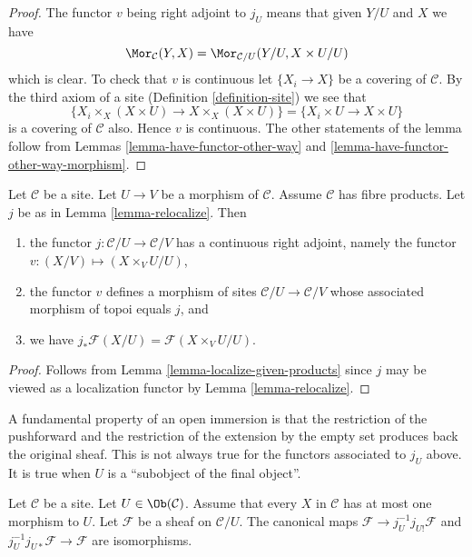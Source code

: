 \begin{proof}
The functor $v$ being right adjoint to $j_U$ means that given $Y/U$ and $X$
we have
$$
\Mor_\mathcal{C}(Y, X)
=
\Mor_{\mathcal{C}/U}(Y/U, X \times U/U)
$$
which is clear. To check that $v$ is continuous let $\{X_i \to X\}$ be
a covering of $\mathcal{C}$. By the third axiom of a site
(Definition \ref{definition-site})
we see that
$$
\{X_i \times_X (X \times U) \to X \times_X (X \times U)\}
=
\{X_i \times U \to X \times U\}
$$
is a covering of $\mathcal{C}$ also. Hence $v$ is continuous. The other
statements of the lemma follow from Lemmas \ref{lemma-have-functor-other-way}
and \ref{lemma-have-functor-other-way-morphism}.
\end{proof}

\begin{lemma}
\label{lemma-relocalize-given-fibre-products}
Let $\mathcal{C}$ be a site. Let $U \to V$ be a morphism of $\mathcal{C}$.
Assume $\mathcal{C}$ has fibre products. Let $j$ be as in
Lemma \ref{lemma-relocalize}. Then
\begin{enumerate}
\item the functor $j : \mathcal{C}/U \to \mathcal{C}/V$
has a continuous right adjoint, namely the functor
$v : (X/V) \mapsto (X \times_V U/U)$,
\item the functor $v$ defines a morphism of sites
$\mathcal{C}/U \to \mathcal{C}/V$ whose associated morphism of topoi equals
$j$, and
\item we have $j_*\mathcal{F}(X/U) = \mathcal{F}(X \times_V U/U)$.
\end{enumerate}
\end{lemma}

\begin{proof}
Follows from Lemma \ref{lemma-localize-given-products} since $j$ may be viewed
as a localization functor by Lemma \ref{lemma-relocalize}.
\end{proof}

\noindent
A fundamental property of an open immersion is
that the restriction of the pushforward and the restriction
of the extension by the empty set produces back the original sheaf.
This is not always true for the functors associated to $j_U$
above. It is true when $U$ is a ``subobject of the final object''.

\begin{lemma}
\label{lemma-restrict-back}
Let $\mathcal{C}$ be a site.
Let $U \in \Ob(\mathcal{C})$.
Assume that every $X$ in $\mathcal{C}$ has at most
one morphism to $U$. Let $\mathcal{F}$ be a sheaf on $\mathcal{C}/U$.
The canonical maps $\mathcal{F} \to j_U^{-1}j_{U!}\mathcal{F}$
and $j_U^{-1}j_{U*}\mathcal{F} \to \mathcal{F}$ are
isomorphisms.
\end{lemma}

